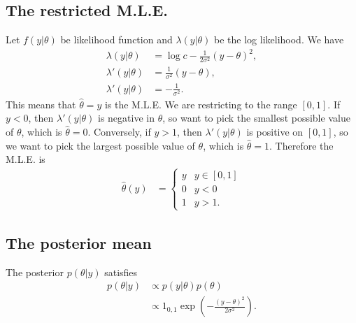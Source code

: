 \documentclass[a4paper,10pt]{article}
\newcommand{\htheta}{\hat{\theta}}
\begin{document}
\subsection{The restricted M.L.E.}
Let $f(y|\theta)$ be likelihood function and $\lambda(y|\theta)$ be the log likelihood.  We have
\begin{align*}
\lambda(y|\theta) &= \log{c} - \frac{1}{2\sigma^{2}}(y - \theta)^{2}, \\
\lambda'(y|\theta) &= \frac{1}{\sigma^{2}}(y - \theta), \\
\lambda'(y|\theta) &= -\frac{1}{\sigma^{2}}.
\end{align*}
This means that $\htheta = y$ is the M.L.E.  We are restricting to the range $[0,1]$.  If $y<0$, then $\lambda'(y|\theta)$ is negative in $\theta$, so want to pick the smallest possible value of $\theta$, which is $\htheta = 0$.  Conversely, if $y > 1$, then $\lambda'(y|\theta)$ is positive on $[0,1]$, so we want to pick the largest possible value of $\theta$, which is $\htheta = 1$.  Therefore the M.L.E. is
\begin{align*}
\htheta(y) &= \begin{cases}
y & y \in [0,1] \\
0 & y < 0 \\
1 & y > 1. \end{cases}
\end{align*}
\subsection{The posterior mean}
The posterior $p(\theta|y)$ satisfies
\begin{align*}
p(\theta|y) &\propto p(y|\theta)p(\theta) \\
&\propto 1_{0,1}\exp\left(-\frac{(y-\theta)^{2}}{2\sigma^{2}}\right).
\end{align*}
\end{document}
